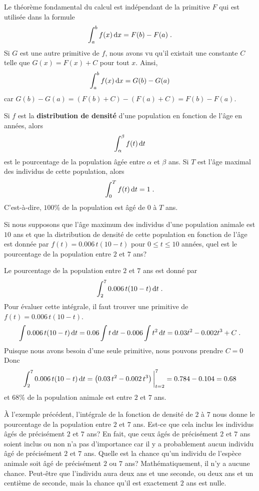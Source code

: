 {\begin{rmk}
Le théorème fondamental du calcul est indépendant de la primitive $F$
qui est utilisée dans la formule
\[
\int_a^b f(x)  \,\mathrm{d}x = F(b) - F(a) \; .
\]
Si $G$ est une autre primitive de $f$, nous avons vu qu'il existait une
constante $C$ telle que $G(x) = F(x) + C$ pour tout $x$.  Ainsi,
\[
\int_a^b f(x)  \,\mathrm{d}x = G(b) - G(a)
\]
car $G(b) - G(a) = (F(b)+C)- (F(a)+C) = F(b)-F(a)$.
\end{rmk}

\begin{egg}
Si $f$ est la {\bfseries distribution de densité} d'une population en
fonction de l'âge en années, alors
\[
\int_\alpha^\beta f(t)\,\mathrm{d}t
\]
est le pourcentage de la population âgée entre $\alpha$ et $\beta$
ans.  Si $T$ est l'âge maximal des individus de cette population, alors
\[
\int_0^T f(t)\,\mathrm{d}t = 1 \; .
\]
C'est-à-dire, $100$\% de la population est âgé de $0$ à $T$ ans.

Si nous supposons que l'âge maximum des individus d'une population animale
est $10$ ans et que la distribution de densité de cette population en
fonction de l'âge est donnée par $f(t) = 0.006\,t(10-t)$ pour
$0\leq t \leq 10$ années, quel est le pourcentage de la population
entre $2$ et $7$ ans?

Le pourcentage de la population entre $2$ et $7$ ans est donné par
\[
\int_2^7 0.006\,t(10-t)\,\mathrm{d}t \; .
\]
Pour évaluer cette intégrale, il faut trouver une primitive de
$f(t) = 0.006\, t(10-t)$. 
\[
\int 0.006\,t(10-t)\,\mathrm{d}t
= 0.06 \int t  \,\mathrm{d}t - 0.006 \int t^2\,\mathrm{d}t
= 0.03 t^2 - 0.002 t^3 + C \; .
\]
Puisque nous avons besoin d'une seule primitive, nous pouvons prendre $C=0$
Donc
\[
\int_2^7 0.006\,t(10-t)\,\mathrm{d}t =
\left(0.03\, t^2 - 0.002\, t^3\right)\bigg|_{t=2}^7 
= 0.784 - 0.104 = 0.68
\]
et $68$\% de la population animale est entre $2$ et $7$ ans.
\end{egg}

\begin{rmk}
À l'exemple précédent, l'intégrale de la fonction de densité de $2$ à
$7$ nous donne le pourcentage de la population entre $2$ et $7$ ans.
Est-ce que cela inclus les individus âgés de précisément $2$ et $7$
ans?  En fait, que ceux âgés de précisément $2$ et $7$ ans soient
inclus ou non n'a pas d'importance car il y a probablement aucun
individu âgé de précisément $2$ et $7$ ans.  Quelle est la chance
qu'un individu de l'espèce animale soit âgé de précisément $2$ ou $7$
ans?  Mathématiquement, il n'y a aucune chance. Peut-être que
l'individu aura deux ans et une seconde, ou deux ans et un centième de
seconde, mais la chance qu'il est exactement $2$ ans est
nulle.
\end{rmk}

}
